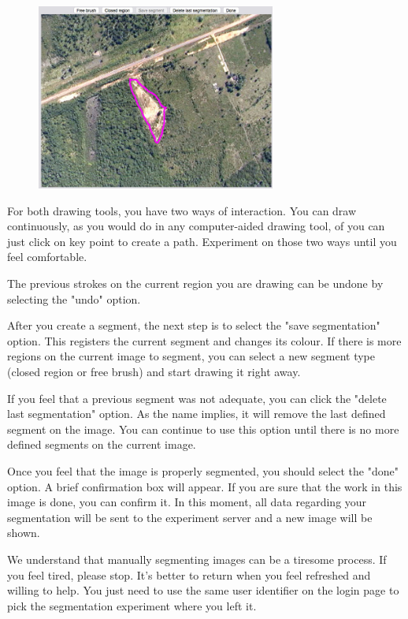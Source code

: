 \begin{figure}[h!]
  \centering
  \includegraphics[width=0.7\textwidth]{imgs/manualseginstr_fig7}
\end{figure}

For both drawing tools, you have two ways of interaction. You can draw continuously, as you would do in any computer-aided drawing tool, of you can just click on key point to create a path. Experiment on those two ways until you feel comfortable.

The previous strokes on the current region you are drawing can be undone by selecting the "undo" option.

After you create a segment, the next step is to select the "save segmentation" option. This registers the current segment and changes its colour. If there is more regions on the current image to segment, you can select a new segment type (closed region or free brush) and start drawing it right away.

If you feel that a previous segment was not adequate, you can click the "delete last segmentation" option. As the name implies, it will remove the last defined segment on the image. You can continue to use this option until there is no more defined segments on the current image.

Once you feel that the image is properly segmented, you should select the "done" option. A brief confirmation box will appear. If you are sure that the work in this image is done, you can confirm it. In this moment, all data regarding your segmentation will be sent to the experiment server and a new image will be shown.

We understand that manually segmenting images can be a tiresome process. If you feel tired, please stop. It's better to return when you feel refreshed and willing to help. You just need to use the same user identifier on the login page to pick the segmentation experiment where you left it.